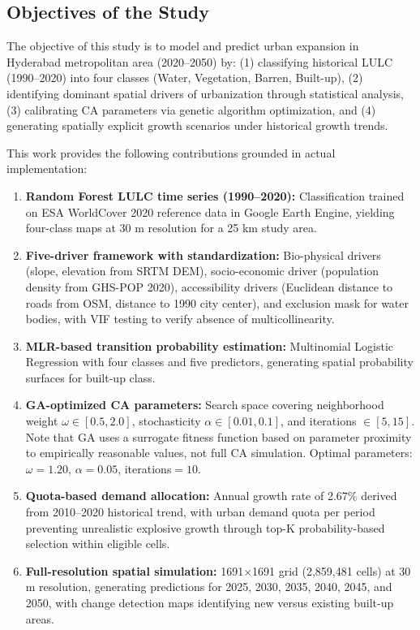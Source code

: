 \documentclass[12pt,a4paper]{article}
\begin{document}
\subsection{Objectives of the Study}
The objective of this study is to model and predict urban expansion in Hyderabad metropolitan area (2020--2050) by: (1) classifying historical LULC (1990--2020) into four classes (Water, Vegetation, Barren, Built-up), (2) identifying dominant spatial drivers of urbanization through statistical analysis, (3) calibrating CA parameters via genetic algorithm optimization, and (4) generating spatially explicit growth scenarios under historical growth trends.

This work provides the following contributions grounded in actual implementation:

\begin{enumerate}
\item \textbf{Random Forest LULC time series (1990--2020):} Classification trained on ESA WorldCover 2020 reference data in Google Earth Engine, yielding four-class maps at 30 m resolution for a 25 km study area.

\item \textbf{Five-driver framework with standardization:} Bio-physical drivers (slope, elevation from SRTM DEM), socio-economic driver (population density from GHS-POP 2020), accessibility drivers (Euclidean distance to roads from OSM, distance to 1990 city center), and exclusion mask for water bodies, with VIF testing to verify absence of multicollinearity.

\item \textbf{MLR-based transition probability estimation:} Multinomial Logistic Regression with four classes and five predictors, generating spatial probability surfaces for built-up class.

\item \textbf{GA-optimized CA parameters:} Search space covering neighborhood weight $\omega \in [0.5, 2.0]$, stochasticity $\alpha \in [0.01, 0.1]$, and iterations $\in [5, 15]$. Note that GA uses a surrogate fitness function based on parameter proximity to empirically reasonable values, not full CA simulation. Optimal parameters: $\omega=1.20$, $\alpha=0.05$, iterations$=10$.

\item \textbf{Quota-based demand allocation:} Annual growth rate of 2.67\% derived from 2010--2020 historical trend, with urban demand quota per period preventing unrealistic explosive growth through top-K probability-based selection within eligible cells.

\item \textbf{Full-resolution spatial simulation:} 1691$\times$1691 grid (2,859,481 cells) at 30 m resolution, generating predictions for 2025, 2030, 2035, 2040, 2045, and 2050, with change detection maps identifying new versus existing built-up areas.
\end{enumerate}
\end{document}
